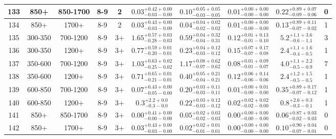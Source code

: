 \documentclass[11pt, oneside]{article}
\begin{document}
\begin{table}
{\begin{tabular}{ |c|c|c|c|c||c|c|c||c|c| }
133 & 850+ & 850-1700 & 8-9 & 2 & $0.03^{+0.42+0.00}_{-0.03-0.00}$ & $0.10^{+0.05+0.05}_{-0.03-0.05}$ & $0.01^{+0.00+0.00}_{-0.00-0.00}$ & $0.22^{+0.89+0.07}_{-0.09-0.06}$ & 0 \\ \hline
134 & 850+ & 1700+ & 8-9 & 2 & $0.03^{+0.43+0.00}_{-0.03-0.00}$ & $0.04^{+0.04+0.02}_{-0.02-0.02}$ & $0.01^{+0.00+0.00}_{-0.00-0.00}$ & $0.13^{+0.89+0.11}_{-0.07-0.02}$ & 1 \\ \hline
135 & 300-350 & 700-1200 & 8-9 & 3+ & $1.65^{+0.57+0.03}_{-0.28-0.03}$ & $0.59^{+0.04+0.32}_{-0.04-0.31}$ & $0.12^{+0.01+0.13}_{-0.01-0.10}$ & $5.2^{+1.1+3.6}_{-0.6-1.1}$ & 3 \\ \hline
136 & 300-350 & 1200+ & 8-9 & 3+ & $0.77^{+0.59+0.01}_{-0.20-0.01}$ & $0.23^{+0.04+0.12}_{-0.03-0.12}$ & $0.15^{+0.07+0.17}_{-0.07-0.08}$ & $2.4^{+1.1+1.6}_{-0.4-0.5}$ & 1 \\ \hline
137 & 350-600 & 700-1200 & 8-9 & 3+ & $1.03^{+0.63+0.02}_{-0.25-0.02}$ & $1.17^{+0.08+0.62}_{-0.07-0.62}$ & $0.08^{+0.01+0.09}_{-0.01-0.07}$ & $4.0^{+1.1+2.2}_{-0.5-0.9}$ & 7 \\ \hline
138 & 350-600 & 1200+ & 8-9 & 3+ & $0.71^{+0.65+0.01}_{-0.21-0.01}$ & $0.40^{+0.05+0.21}_{-0.04-0.21}$ & $0.12^{+0.06+0.14}_{-0.06-0.06}$ & $2.4^{+1.2+1.5}_{-0.5-0.5}$ & 1 \\ \hline
139 & 600-850 & 700-1200 & 8-9 & 3+ & $0.07^{+0.43+0.00}_{-0.05-0.00}$ & $0.20^{+0.03+0.11}_{-0.03-0.11}$ & $0.01^{+0.00+0.01}_{-0.00-0.00}$ & $0.35^{+0.89+0.17}_{-0.07-0.12}$ & 1 \\ \hline
140 & 600-850 & 1200+ & 8-9 & 3+ & $0.3^{+2.2+0.0}_{-0.3-0.0}$ & $0.22^{+0.03+0.12}_{-0.03-0.12}$ & $0.02^{+0.02+0.02}_{-0.02-0.00}$ & $0.8^{+2.6+0.3}_{-0.3-0.1}$ & 1 \\ \hline
141 & 850+ & 850-1700 & 8-9 & 3+ & $0.00^{+0.41+0.00}_{-0.00-0.00}$ & $0.05^{+0.02+0.03}_{-0.02-0.03}$ & $0.00^{+0.00+0.00}_{-0.00-0.00}$ & $0.06^{+0.87+0.03}_{-0.02-0.03}$ & 0 \\ \hline
142 & 850+ & 1700+ & 8-9 & 3+ & $0.03^{+0.43+0.00}_{-0.03-0.00}$ & $0.02^{+0.02+0.01}_{-0.01-0.01}$ & $0.00^{+0.00+0.00}_{-0.00-0.00}$ & $0.10^{+0.90+0.04}_{-0.07-0.01}$ & 0 \\ \hline
\end{tabular}}
\end{table}
\end{document}
